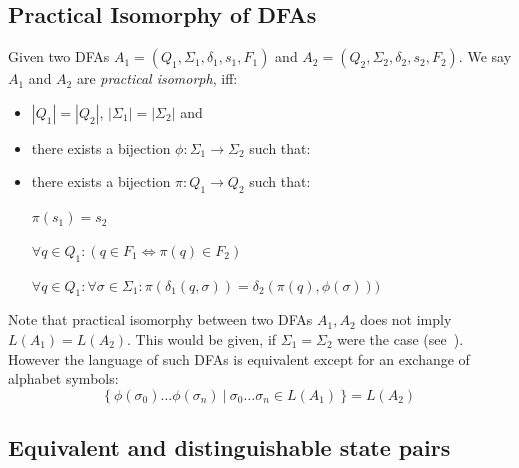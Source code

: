 \subsection{Practical Isomorphy of DFAs}

Given two DFAs $A_1 = (Q_1, \Sigma_1, \delta_1, s_1, F_1)$ and $A_2 = (Q_2, \Sigma_2, \delta_2, s_2, F_2)$. We say $A_1$ and $A_2$ are \emph{practical isomorph}, iff:
\begin{itemize}
	\item $|Q_1| = |Q_2|$, $|\Sigma_1| = |\Sigma_2|$ and
	\item there exists a bijection $\phi\colon \Sigma_1 \to \Sigma_2$ such that:
	\item there exists a bijection $\pi\colon Q_1 \to Q_2$ such that:
	
	$\pi(s_1) = s_2$
	
	$\forall q\in Q_1\colon (q\in F_1 \Longleftrightarrow \pi(q)\in F_2)$
	
	$\forall q\in Q_1\colon \forall\sigma\in\Sigma_1\colon \pi(\delta_1(q,\sigma))=\delta_2(\pi(q),\phi(\sigma)))$
\end{itemize}
Note that practical isomorphy between two DFAs $A_1, A_2$ does not imply $L(A_1) = L(A_2)$. This would be given, if $\Sigma_1 = \Sigma_2$ were the case (see~\cite[p. 45]{schoening01}). However the language of such DFAs is equivalent except for an exchange of alphabet symbols:
\[
	\{\ \phi(\sigma_0)\ldots\phi(\sigma_n)\ |\ \sigma_0\ldots\sigma_n\in L(A_1)\ \} = L(A_2)
\]

\subsection{Equivalent and distinguishable state pairs}

